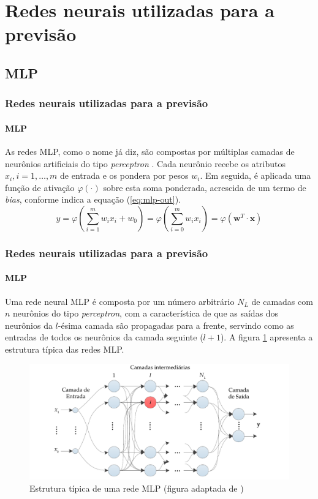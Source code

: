 \documentclass[aspectratio=169]{beamer}
\begin{document}
\section{Redes neurais utilizadas para a previsão}

\subsection{MLP}

\begin{frame}
\frametitle{Redes neurais utilizadas para a previsão}
\framesubtitle{MLP}
\justifying As redes MLP, como o nome já diz, são compostas por múltiplas camadas de neurônios artificiais do tipo \textit{perceptron}  \cite{rosenblatt1958perceptron}. Cada neurônio recebe os atributos $x_i, i = 1, \ldots, m$ de entrada e os pondera por pesos $w_i$. Em seguida, é aplicada uma função de ativação $\varphi(\cdot)$ sobre esta soma ponderada, acrescida de um termo de \textit{bias}, conforme indica a equação (\ref{eq:mlp-out}).
\begin{equation}\label{eq:mlp-out}
y = \varphi  \left(\sum_{i=1}^{m}w_i x_i + w_0 \right) = \varphi \left(\sum_{i=0}^{m}w_i x_i \right) = \varphi \left(\mathbf{w}^T \cdot \mathbf{x} \right)
\end{equation}
\end{frame}

\begin{frame}
\frametitle{Redes neurais utilizadas para a previsão}
\framesubtitle{MLP}
\justifying Uma rede neural MLP é composta por um número arbitrário $N_L$ de  camadas com $n$ neurônios do tipo \textit{perceptron}, com a característica de que as saídas dos neurônios da $l$-ésima camada são propagadas para a frente, servindo como as entradas de todos os neurônios da camada seguinte ($l+1$). A figura \ref{fig:mlp-architecture} apresenta a estrutura típica das redes MLP.
\begin{figure}[H]
\centering
\includegraphics[scale = 0.3]{mlp-network.pdf}
\caption{Estrutura típica de uma rede MLP (figura adaptada de \cite{boccato2013novas}) }
\label{fig:mlp-architecture}
\end{figure}
\end{frame}
\end{document}
